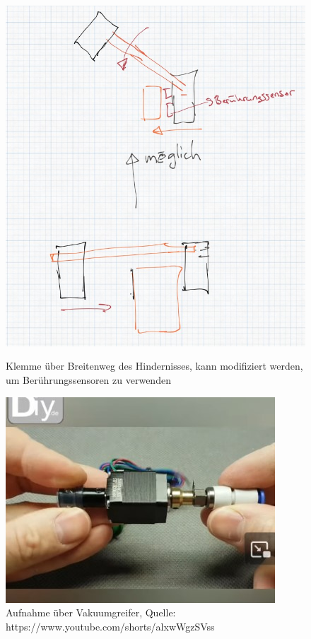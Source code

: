 \newpage
\begin{figure}[h!]
    \centering
    \begin{minipage}{0.45\textwidth}
        \centering
        \includegraphics[width=\textwidth]{img/technologierecherche/Aufnahme/Breiterweg_Griff.jpg}
        \caption{Klemme über Breitenweg des Hindernisses, kann modifiziert werden, um Berührungssensoren zu verwenden}
        \label{img:tech_Breiterweg_Griff}
    \end{minipage}
    \hfill
    \begin{minipage}{0.45\textwidth}
        \centering
        \includegraphics[width=\textwidth]{img/technologierecherche/Aufnahme/Vakuumgreifer.jpg}
        \caption{Aufnahme über Vakuumgreifer, Quelle: https://www.youtube.com/shorts/alxwWgzSVss} 
        \label{img:tech_Vakuumgreifer}
    \end{minipage}
\end{figure}


